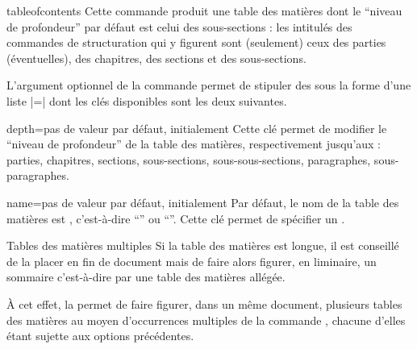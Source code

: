 \begin{docCommand}[doc description=\mandatory]{tableofcontents}{}
  Cette commande produit une table des matières dont le \enquote{niveau de
    profondeur} par défaut est celui des sous-sections : les intitulés des
  commandes de structuration qui y figurent sont (seulement) ceux des parties
  (éventuelles), des chapitres, des sections et des sous-sections.
\end{docCommand}

L'argument optionnel de la commande  permet de stipuler
des  sous la forme d'une liste |=| dont
les clés disponibles sont les deux suivantes.
{%
  \begin{docKey}{depth}{=\textbar{}\textbar{}\textbar{}\textbar{}\textbar{}\textbar{}}{pas
      de valeur par défaut, initialement }
    Cette clé permet de modifier le \enquote{niveau de profondeur} de la table
    des matières, respectivement jusqu'aux : parties, chapitres, sections,
    sous-sections, sous-sous-sections, paragraphes, sous-paragraphes.
  \end{docKey}
}
%
\begin{docKey}{name}{=}{pas de valeur par défaut,
    initialement }
  Par défaut, le nom de la table des matières est ,
  c'est-à-dire \enquote{\contentsname} ou
  \enquote{\contentsname}\selonlangueshort{}. Cette clé
  permet de spécifier un \redefexprcle.
\end{docKey}

\begin{dbremark}{Tables des matières multiples}{}
  Si la table des matières est longue, il est conseillé de la placer en fin de
  document mais de faire alors figurer, en \gls{liminaire}, un sommaire
  c'est-à-dire par une table des matières allégée.

  À cet effet, la \yatCl{} permet de faire figurer, dans un même document,
  plusieurs tables des matières au moyen d'occurrences multiples de la commande
  , chacune d'elles étant sujette aux options
  précédentes.
\end{dbremark}

